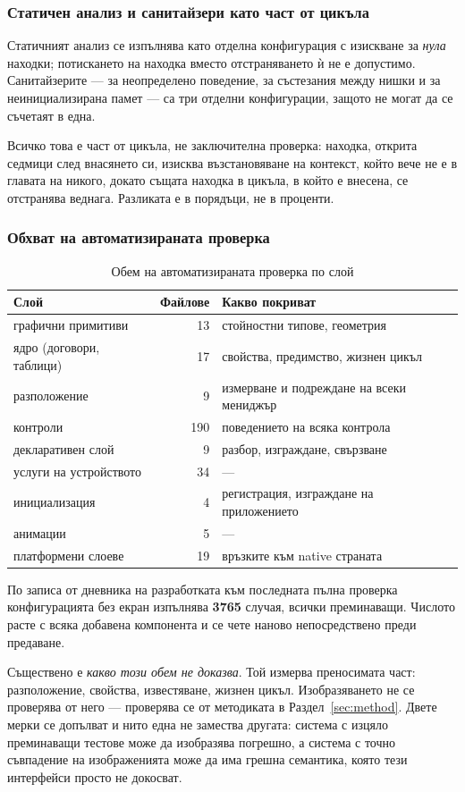 \subsubsection{Статичен анализ и санитайзери като част от цикъла}

Статичният анализ се изпълнява като отделна конфигурация с изискване за \emph{нула}
находки; потискането на находка вместо отстраняването ѝ не е допустимо. Санитайзерите ---
за неопределено поведение, за състезания между нишки и за неинициализирана памет --- са три
отделни конфигурации, защото не могат да се съчетаят в една.

Всичко това е част от цикъла, не заключителна проверка: находка, открита седмици след
внасянето си, изисква възстановяване на контекст, който вече не е в главата на никого,
докато същата находка в цикъла, в който е внесена, се отстранява веднага. Разликата е в
порядъци, не в проценти.

\subsubsection{Обхват на автоматизираната проверка}

\begin{table}[H]
\caption{Обем на автоматизираната проверка по слой}
\label{tab:tests}
\centering\small
\begin{tabular}{@{}L{4.2cm}rL{6.4cm}@{}}
\hline
\textbf{Слой} & \textbf{Файлове} & \textbf{Какво покриват} \\
\hline
графични примитиви & 13  & стойностни типове, геометрия \\
ядро (договори, таблици) & 17 & свойства, предимство, жизнен цикъл \\
разположение & 9 & измерване и подреждане на всеки мениджър \\
контроли & 190 & поведението на всяка контрола \\
декларативен слой & 9 & разбор, изграждане, свързване \\
услуги на устройството & 34 & — \\
инициализация & 4 & регистрация, изграждане на приложението \\
анимации & 5 & — \\
платформени слоеве & 19 & връзките към native страната \\
\hline
\end{tabular}
\end{table}

По записа от дневника на разработката към последната пълна проверка конфигурацията без
екран изпълнява \textbf{3765} случая, всички преминаващи. Числото расте с всяка добавена
компонента и се чете наново непосредствено преди предаване.

Съществено е \emph{какво този обем не доказва}. Той измерва преносимата част: разположение,
свойства, известяване, жизнен цикъл. Изобразяването не се проверява от него --- проверява
се от методиката в Раздел~\ref{sec:method}. Двете мерки се допълват и нито една не замества
другата: система с изцяло преминаващи тестове може да изобразява погрешно, а система с
точно съвпадение на изображенията може да има грешна семантика, която тези интерфейси просто
не докосват.
